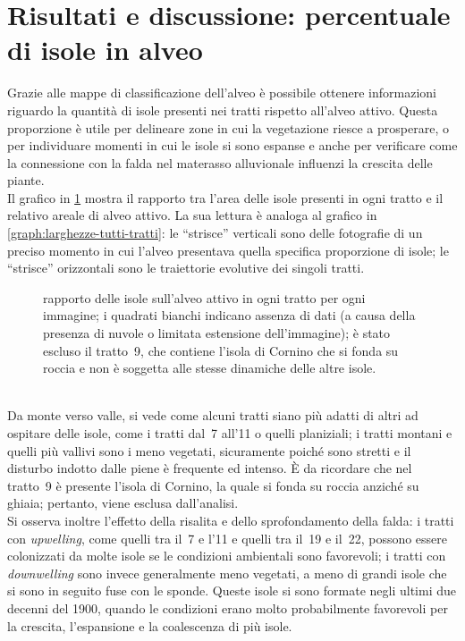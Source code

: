 \section{Risultati e discussione: percentuale di isole in alveo}
\label{sec:perc-isole-in-alveo}
Grazie alle mappe di classificazione dell'alveo è possibile ottenere informazioni riguardo la quantità di isole presenti nei tratti rispetto all'alveo attivo.
Questa proporzione è utile per delineare zone in cui la vegetazione riesce a prosperare, o per individuare momenti in cui le isole si sono espanse e anche per verificare come la connessione con la falda nel materasso alluvionale influenzi la crescita delle piante.
\\
Il grafico in \cref{graph:rapp-isl-tutti-tratti} mostra il rapporto tra l'area delle isole presenti in ogni tratto e il relativo areale di alveo attivo.
La sua lettura è analoga al grafico in \cref{graph:larghezze-tutti-tratti}: le “strisce” verticali sono delle fotografie di un preciso momento in cui l'alveo presentava quella specifica proporzione di isole; le “strisce” orizzontali sono le traiettorie evolutive dei singoli tratti.
%
\begin{figure}
	\centering
	
	\caption[rapporto delle isole sull'alveo attivo in ogni tratto per ogni immagine]{rapporto delle isole sull'alveo attivo in ogni tratto per ogni immagine; i quadrati bianchi indicano assenza di dati (a causa della presenza di nuvole o limitata estensione dell'immagine); è stato escluso il tratto~9, che contiene l'isola di Cornino che si fonda su roccia e non è soggetta alle stesse dinamiche delle altre isole.}
	\label{graph:rapp-isl-tutti-tratti}
\end{figure}
%
\\
Da monte verso valle, si vede come alcuni tratti siano più adatti di altri ad ospitare delle isole, come i tratti dal~7 all'11 o quelli planiziali;
i tratti montani e quelli più vallivi sono i meno vegetati, sicuramente poiché sono stretti e il disturbo indotto dalle piene è frequente ed intenso.
È da ricordare che nel tratto~9 è presente l'isola di Cornino, la quale si fonda su roccia anziché su ghiaia; pertanto, viene esclusa dall'analisi.
\\
Si osserva inoltre l'effetto della risalita e dello sprofondamento della falda:
i tratti con \emph{upwelling}, come quelli tra il~7 e l'11 e quelli tra il~19 e il~22, possono essere colonizzati da molte isole se le condizioni ambientali sono favorevoli; i tratti con \emph{downwelling} sono invece generalmente meno vegetati, a meno di grandi isole che si sono in seguito fuse con le sponde. Queste isole si sono formate negli ultimi due decenni del 1900, quando le condizioni erano molto probabilmente favorevoli per la crescita, l'espansione e la coalescenza di più isole.
